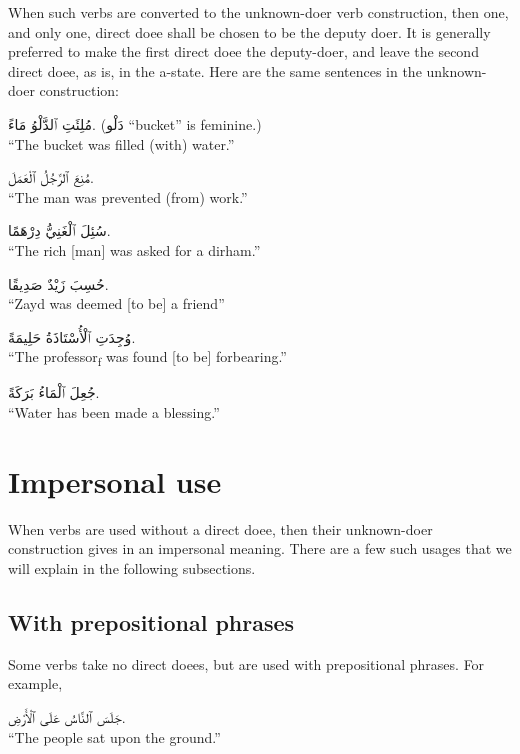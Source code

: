 \documentclass[
  10pt,
]{book}
\begin{document}
When such verbs are converted to the unknown-doer verb construction, then one, and only one, direct doee shall be chosen to be the deputy doer. It is generally preferred to make the first direct doee the deputy-doer, and leave the second direct doee, as is, in the a-state.
Here are the same sentences in the unknown-doer construction:

\foreignlanguage{arabic}{مُلِئَتِ ٱلدَّلْوُ مَاءً.} (\foreignlanguage{arabic}{دَلْو} \enquote{bucket} is feminine.)\\
\enquote{The bucket was filled (with) water.}

\foreignlanguage{arabic}{مُنِعَ ٱلرَّجُلُ ٱلْعَمَلَ.}\\
\enquote{The man was prevented (from) work.}

\foreignlanguage{arabic}{سُئِلَ ٱلْغَنِيُّ دِرْهَمًا.}\\
\enquote{The rich {[}man{]} was asked for a dirham.}

\foreignlanguage{arabic}{حُسِبَ زَيْدٌ صَدِيقًا.}\\
\enquote{Zayd was deemed {[}to be{]} a friend}

\foreignlanguage{arabic}{وُجِدَتِ ٱلْأُسْتَاذَةُ حَلِيمَةً.}\\
\enquote{The professor\textsubscript{f} was found {[}to be{]} forbearing.}

\foreignlanguage{arabic}{جُعِلَ ٱلْمَاءُ بَرَکَةً.}\\
\enquote{Water has been made a blessing.}

\section{Impersonal use}\label{impersonal-use}

When verbs are used without a direct doee, then their unknown-doer construction gives in an impersonal meaning. There are a few such usages that we will explain in the following subsections.

\subsection{With prepositional phrases}\label{with-prepositional-phrases}

Some verbs take no direct doees, but are used with prepositional phrases. For example,

\foreignlanguage{arabic}{جَلَسَ ٱلنَّاسُ عَلَى ٱلْأَرْضِ.}\\
\enquote{The people sat upon the ground.}
\end{document}
